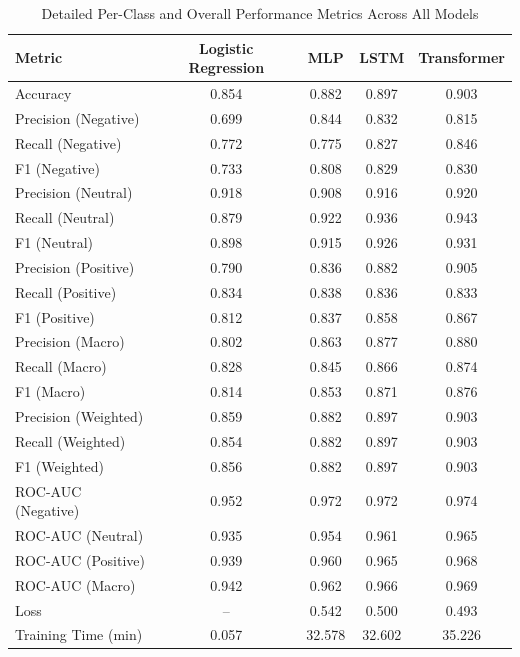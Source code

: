\begin{table}[H]
\centering  
\caption{Detailed Per-Class and Overall Performance Metrics Across All Models}
\vspace{0.5em}
\label{tab:full_appendix_metrics}
\setlength{\tabcolsep}{20pt}
\renewcommand{\arraystretch}{2.3}
\begin{tabular}{lcccc}
\toprule
Metric & Logistic Regression & MLP & LSTM & Transformer \\
\midrule
Accuracy & 0.854 & 0.882 & 0.897 & 0.903 \\
Precision (Negative) & 0.699 & 0.844 & 0.832 & 0.815 \\
Recall (Negative) & 0.772 & 0.775 & 0.827 & 0.846 \\
F1 (Negative) & 0.733 & 0.808 & 0.829 & 0.830 \\
Precision (Neutral) & 0.918 & 0.908 & 0.916 & 0.920 \\
Recall (Neutral) & 0.879 & 0.922 & 0.936 & 0.943 \\
F1 (Neutral) & 0.898 & 0.915 & 0.926 & 0.931 \\
Precision (Positive) & 0.790 & 0.836 & 0.882 & 0.905 \\
Recall (Positive) & 0.834 & 0.838 & 0.836 & 0.833 \\
F1 (Positive) & 0.812 & 0.837 & 0.858 & 0.867 \\
Precision (Macro) & 0.802 & 0.863 & 0.877 & 0.880 \\
Recall (Macro) & 0.828 & 0.845 & 0.866 & 0.874 \\
F1 (Macro) & 0.814 & 0.853 & 0.871 & 0.876 \\
Precision (Weighted) & 0.859 & 0.882 & 0.897 & 0.903 \\
Recall (Weighted) & 0.854 & 0.882 & 0.897 & 0.903 \\
F1 (Weighted) & 0.856 & 0.882 & 0.897 & 0.903 \\
ROC-AUC (Negative) & 0.952 & 0.972 & 0.972 & 0.974 \\
ROC-AUC (Neutral) & 0.935 & 0.954 & 0.961 & 0.965 \\
ROC-AUC (Positive) & 0.939 & 0.960 & 0.965 & 0.968 \\
ROC-AUC (Macro) & 0.942 & 0.962 & 0.966 & 0.969 \\
Loss & -- & 0.542 & 0.500 & 0.493 \\
Training Time (min) & 0.057 & 32.578 & 32.602 & 35.226 \\
\bottomrule
\end{tabular}
\end{table}
